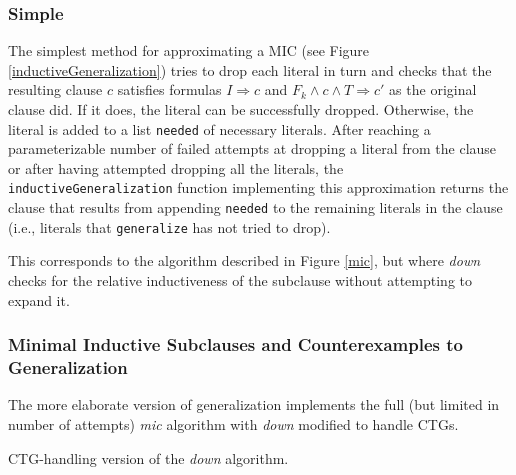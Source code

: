 \documentclass[12pt,a4paper,twoside,openright]{report}
\begin{document}
{{\subsubsection{Simple}
The simplest method for approximating a MIC (see Figure \ref{inductiveGeneralization})
tries to drop each literal in turn and checks
that the resulting clause $c$ satisfies formulas $I \Rightarrow c$ and
$F_k \wedge c \wedge T \Rightarrow c'$ as the original clause did.
If it does, the literal can be successfully dropped.
Otherwise, the literal is added to a list \verb,needed, of necessary literals.
After reaching a parameterizable number of failed attempts at dropping a literal from the clause or after
having attempted dropping all the literals, the
\verb,inductiveGeneralization, function implementing this approximation
returns the clause that results from appending \verb,needed, to the remaining
literals in the clause (i.e., literals that \verb,generalize, has not tried to drop).

This corresponds to the algorithm described in Figure \ref{mic}, but where {\it down}
checks for the relative inductiveness of the subclause without attempting to expand it.

\subsubsection{Minimal Inductive Subclauses and Counterexamples to Generalization}
The more elaborate version of generalization implements the full
(but limited in number of attempts) {\it mic} algorithm with {\it down} modified
to handle CTGs.

\begin{algorithm}[t]
\DontPrintSemicolon
{}
\caption{CTG-handling version of the {\it down} algorithm.}
\label{ctgdown}
\end{algorithm}

}}
\end{document}
